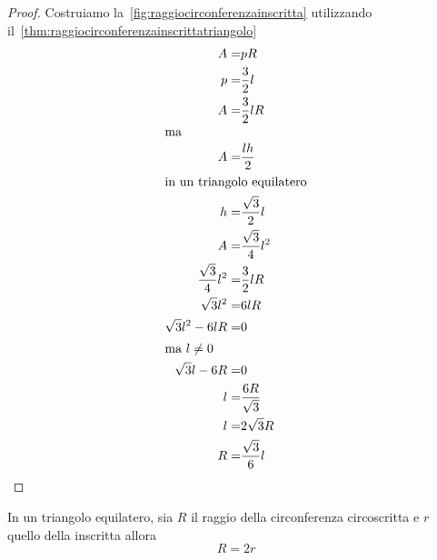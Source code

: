 \begin{proof}
Costruiamo la~\cref{fig:raggiocirconferenzainscritta}	
utilizzando il~\cref{thm:raggiocirconferenzainscrittatriangolo}
\begin{align*}
	A=&pR\\
	p=&\frac{3}{2}l\\
	A=&\frac{3}{2}lR\\
	\intertext{ma}
	A=&\frac{lh}{2}\\
	\intertext{in un triangolo equilatero}
	h=&\frac{\sqrt{3}}{2}l\\
	A=&\frac{\sqrt{3}}{4}l^2\\
	\frac{\sqrt{3}}{4}l^2=&\frac{3}{2}lR\\
	\sqrt{3}l^2=&6lR\\
	\sqrt{3}l^2-6lR=&0\\
	\intertext{ma $l\neq0$}
	\sqrt{3}l-6R=&0\\
	l=&\dfrac{6R}{\sqrt{3}}\\
	l=&2\sqrt{3}R\\
	R=&\dfrac{\sqrt{3}}{6}l
\end{align*}
\end{proof}
\begin{thm}\label{thm:raggicirconferenzeinscrittacircoscritta}
	In un triangolo equilatero, sia $R$ il raggio della circonferenza circoscritta e $r$ quello della inscritta allora\[R=2r\]  
\end{thm}